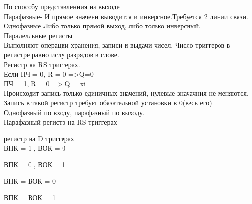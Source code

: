 По способу представленния на выходе\\
Парафазные-
И прямое значени выводится и инверсное.Требуется 2 линии связи.\\
Однофазные
Либо только прямой выход, либо только инверсный.\\

Паралелльные регисты\\
Выполняют операции хранения, записи и выдачи чисел. Число триггеров в регистре равно ислу разрядов в слове.\\

Регистр на RS триггерах.\\
Если ПЧ = 0, R = 0 =>Q=0\\
ПЧ = 1, R = 0 => Q = xi\\
Происходит запись только единичных значений, нулевые значачния не меняются. \\
Запись в такой регистр требует обязательной установки в 0(весь его)\\
Однофазный по входу, парафазный по выходу.\\

Парафазный регистр на RS триггерах

 регистр на D триггерах\\
ВПК = 1 , ВОК = 0

ВПК = 0 , ВОК = 1

ВПК =  ВОК = 0

ВПК =  ВОК = 1


